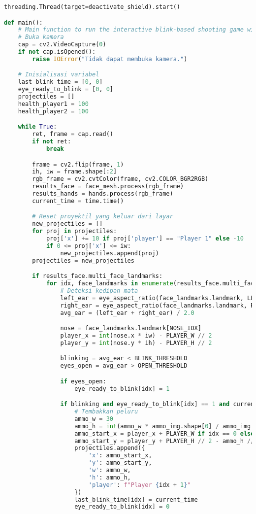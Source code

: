 \documentclass[11pt,a4paper]{article}
\begin{document}
\begin{lstlisting}[language=Python, caption=Main.py]
    threading.Thread(target=deactivate_shield).start()

def main():
    # Main function to run the interactive blink-based shooting game with two players.
    # Buka kamera
    cap = cv2.VideoCapture(0)
    if not cap.isOpened():
        raise IOError("Tidak dapat membuka kamera.")

    # Inisialisasi variabel
    last_blink_time = [0, 0]
    eye_ready_to_blink = [0, 0]
    projectiles = []
    health_player1 = 100
    health_player2 = 100

    while True:
        ret, frame = cap.read()
        if not ret:
            break

        frame = cv2.flip(frame, 1)
        ih, iw = frame.shape[:2]
        rgb_frame = cv2.cvtColor(frame, cv2.COLOR_BGR2RGB)
        results_face = face_mesh.process(rgb_frame)
        results_hands = hands.process(rgb_frame)
        current_time = time.time()

        # Reset proyektil yang keluar dari layar
        new_projectiles = []
        for proj in projectiles:
            proj['x'] += 10 if proj['player'] == "Player 1" else -10
            if 0 <= proj['x'] <= iw:
                new_projectiles.append(proj)
        projectiles = new_projectiles

        if results_face.multi_face_landmarks:
            for idx, face_landmarks in enumerate(results_face.multi_face_landmarks[:2]):
                # Deteksi kedipan mata
                left_ear = eye_aspect_ratio(face_landmarks.landmark, LEFT_EYE_IDX, iw, ih)
                right_ear = eye_aspect_ratio(face_landmarks.landmark, RIGHT_EYE_IDX, iw, ih)
                avg_ear = (left_ear + right_ear) / 2.0

                nose = face_landmarks.landmark[NOSE_IDX]
                player_x = int(nose.x * iw) - PLAYER_W // 2
                player_y = int(nose.y * ih) - PLAYER_H // 2

                blinking = avg_ear < BLINK_THRESHOLD
                eyes_open = avg_ear > OPEN_THRESHOLD

                if eyes_open:
                    eye_ready_to_blink[idx] = 1

                if blinking and eye_ready_to_blink[idx] == 1 and current_time - last_blink_time[idx] >= BLINK_COOLDOWN:
                    # Tembakkan peluru
                    ammo_w = 30
                    ammo_h = int(ammo_w * ammo_img.shape[0] / ammo_img.shape[1])
                    ammo_start_x = player_x + PLAYER_W if idx == 0 else player_x - ammo_w
                    ammo_start_y = player_y + PLAYER_H // 2 - ammo_h // 2
                    projectiles.append({
                        'x': ammo_start_x,
                        'y': ammo_start_y,
                        'w': ammo_w,
                        'h': ammo_h,
                        'player': f"Player {idx + 1}"
                    })
                    last_blink_time[idx] = current_time
                    eye_ready_to_blink[idx] = 0


\end{lstlisting}
\end{document}
